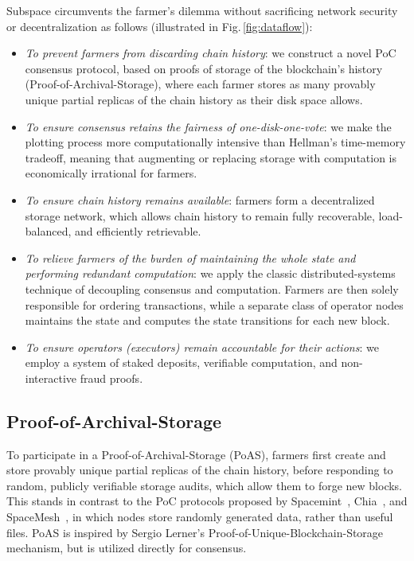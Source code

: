 \documentclass[conference]{IEEEtran}
\begin{document}
Subspace circumvents the farmer’s dilemma without sacrificing network security or decentralization as follows (illustrated in Fig.\,\ref{fig:dataflow}):
\begin{itemize}
    \item \textit{To prevent farmers from discarding chain history}: we construct a novel PoC consensus protocol, based on proofs of storage of the blockchain's history (Proof-of-Archival-Storage), where each farmer stores as many provably unique partial replicas of the chain history as their disk space allows.
    \item \textit{To ensure consensus retains the fairness of one-disk-one-vote}: we make the plotting process more computationally intensive than Hellman's time-memory tradeoff\cite{beyond_hellman}, meaning that augmenting or replacing storage with computation is economically irrational for farmers.
    \item \textit{To ensure chain history remains available}: farmers form a decentralized storage network, which allows chain history to remain fully recoverable, load-balanced, and efficiently retrievable.
    \item \textit{To relieve farmers of the burden of maintaining the whole state and performing redundant computation}: we apply the classic distributed-systems technique of decoupling consensus and computation. Farmers are then solely responsible for ordering transactions, while a separate class of operator nodes maintains the state and computes the state transitions for each new block.
    \item \textit{To ensure operators (executors) remain accountable for their actions}: we employ a system of staked deposits, verifiable computation, and non-interactive fraud proofs.
\end{itemize}

\subsection{Proof-of-Archival-Storage}
\label{sec:poas}
To participate in a Proof-of-Archival-Storage (PoAS), farmers first create and store provably unique partial replicas of the chain history, before responding to random, publicly verifiable storage audits, which allow them to forge new blocks. This stands in contrast to the PoC protocols proposed by Spacemint~\cite{spacemint}, Chia~\cite{chia}, and SpaceMesh~\cite{spacemesh}, in which nodes store randomly generated data, rather than useful files. PoAS is inspired by Sergio Lerner's Proof-of-Unique-Blockchain-Storage~\cite{lerner2015} mechanism, but is utilized directly for consensus.
\end{document}
